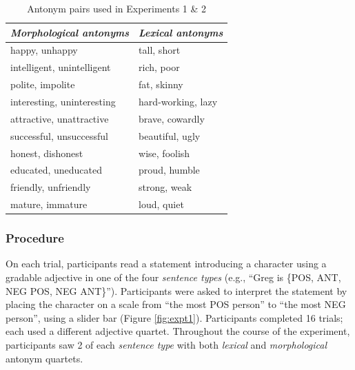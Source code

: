 \documentclass[10pt,letterpaper]{article}
\newcommand{\figref}[1]{Figure \ref{#1}}
\begin{document}
\begin{table}[b]
\centering
\begin{tabular}{l|l}
\emph{Morphological antonyms}     & \emph{Lexical antonyms}    \\ 
\hline
happy, unhappy             & tall, short         \\
intelligent, unintelligent & rich, poor          \\
polite, impolite           & fat, skinny         \\
interesting, uninteresting & hard-working, lazy  \\
attractive, unattractive   & brave, cowardly     \\
successful, unsuccessful   & beautiful, ugly     \\
honest, dishonest          & wise, foolish       \\
educated, uneducated       & proud, humble       \\
friendly, unfriendly       & strong, weak        \\
mature, immature           & loud, quiet        
\end{tabular}
\caption{Antonym pairs used in Experiments 1 \& 2}
\label{tab:items}
\end{table}


\subsubsection{Procedure}

On each trial, participants read a statement introducing a character using a gradable adjective in one of the four \emph{sentence types} (e.g., ``Greg is \{POS, ANT, NEG POS, NEG ANT\}'').
Participants were asked to interpret the statement by placing the character on a scale from ``the most POS person'' to ``the most NEG person'', using a slider bar (\figref{fig:expt1}).
Participants completed 16 trials; each used a different adjective quartet.
Throughout the course of the experiment, participants saw 2 of each \emph{sentence type} with both \emph{lexical} and \emph{morphological} antonym quartets. 
\end{document}
